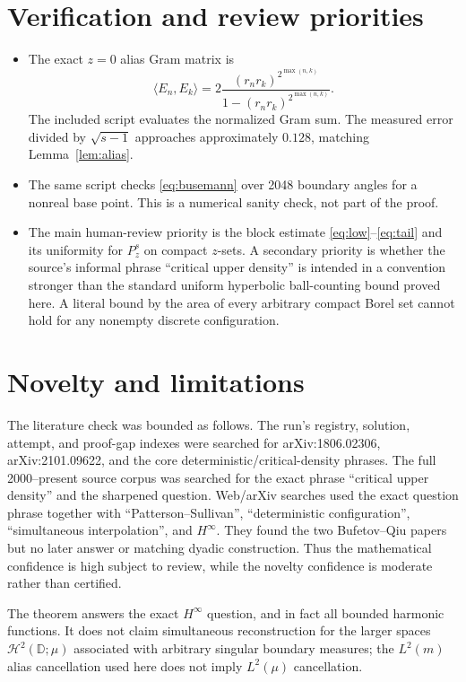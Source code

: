 \documentclass[11pt]{article}
\newcommand{\D}{\mathbb D}
\begin{document}
\section{Verification and review priorities}

\begin{itemize}
\item The exact $z=0$ alias Gram matrix is
\[
 \langle E_n,E_k\rangle
 =2\frac{(r_nr_k)^{2^{\max(n,k)}}}
 {1-(r_nr_k)^{2^{\max(n,k)}}}.
\]
The included script evaluates the normalized Gram sum.  The measured error
divided by $\sqrt{s-1}$ approaches approximately $0.128$, matching
Lemma~\ref{lem:alias}.
\item The same script checks \eqref{eq:busemann} over 2048 boundary angles
for a nonreal base point.  This is a numerical sanity check, not part of the
proof.
\item The main human-review priority is the block estimate
\eqref{eq:low}--\eqref{eq:tail} and its uniformity for $P_z^s$ on compact
$z$-sets.  A secondary priority is whether the source's informal phrase
``critical upper density'' is intended in a convention stronger than the
standard uniform hyperbolic ball-counting bound proved here.  A literal bound
by the area of every arbitrary compact Borel set cannot hold for any nonempty
discrete configuration.
\end{itemize}

\section{Novelty and limitations}

The literature check was bounded as follows.  The run's registry, solution,
attempt, and proof-gap indexes were searched for arXiv:1806.02306,
arXiv:2101.09622, and the core deterministic/critical-density phrases.  The
full 2000--present source corpus was searched for the exact phrase ``critical
upper density'' and the sharpened question.  Web/arXiv searches used the
exact question phrase together with ``Patterson--Sullivan'',
``deterministic configuration'', ``simultaneous interpolation'', and
$H^\infty$.  They found the two Bufetov--Qiu papers but no later answer or
matching dyadic construction.  Thus the mathematical confidence is high
subject to review, while the novelty confidence is moderate rather than
certified.

The theorem answers the exact $H^\infty$ question, and in fact all bounded
harmonic functions.  It does not claim simultaneous reconstruction for the
larger spaces $\mathcal H^2(\D;\mu)$ associated with arbitrary singular
boundary measures; the $L^2(m)$ alias cancellation used here does not imply
$L^2(\mu)$ cancellation.
\end{document}
